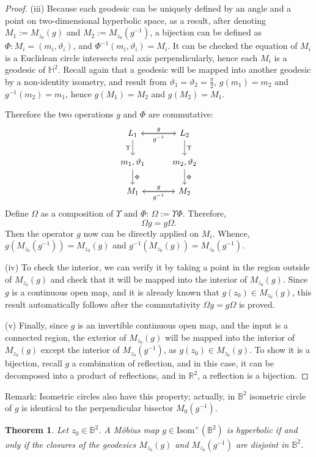 \documentclass[12pt,oneside]{sfsuthesis}
\theoremstyle{plain} %
\newtheorem{theorem}{Theorem}[chapter]
\theoremstyle{definition}  %
\theoremstyle{remark}  %
\theoremstyle{plain}
\begin{document}
{\begin{proof}
(iii) Because each geodesic can be uniquely defined by an angle and a point on two-dimensional hyperbolic space, as a result, after denoting $M_1:=M_{z_0}(g)$ and $M_2:=M_{z_0}(g^{-1})$, a bijection can be defined as $\Phi:M_i=(m_i,\vartheta_i)$, and $\Phi^{-1}(m_i,\vartheta_i)=M_i$. It can be checked the equation of $M_i$ is a Euclidean circle intersects real axis perpendicularly, hence each $M_i$ is a geodesic of $\mathbb{H}^2$. Recall again that a geodesic will be mapped into another geodesic by a non-identity isometry, and result from $\vartheta_1=\vartheta_2=\frac{\pi}{2}$, $g(m_1)=m_2$ and $g^{-1}(m_2)=m_1$, hence $g(M_1)=M_2$ and $g(M_2)=M_1$.

Therefore the two operations $g$ and $\Phi$ are commutative:
\[ \begin{tikzcd}
L_1 \arrow{r}{g} \arrow[swap]{d}{\Upsilon} &\arrow{l}{g^{-1}} L_2 \arrow{d}{\Upsilon} \\%
m_1,\vartheta_1\arrow{d}{\Phi} & m_2,\vartheta_2\arrow{d}{\Phi}
\\%
M_1 \arrow{r}{g}& \arrow{l}{g^{-1}} M_2
\end{tikzcd}
\]
Define $\Omega$ as a composition of $\Upsilon$ and $\Phi$: $\Omega:=\Upsilon\Phi$. Therefore, $$ \Omega g = g \Omega.$$ Then the operator $g$ now can be directly applied on $M_i$. Whence, $g(M_{z_0}(g^{-1}))=M_{z_0}(g)$ and $g^{-1}(M_{z_0}(g))=M_{z_0}(g^{-1}).$

(iv) To check the interior, we can verify it by taking a point in the region outside of $M_{z_0}(g)$ and check that it will be mapped into the interior of $M_{z_0}(g)$. Since $g$ is a continuous open map, and it is already known that $g(z_0)\in M_{z_0}(g)$, this result automatically follows after the commutativity $\Omega g = g \Omega$ is proved.

(v) Finally, since $g$ is an invertible continuous open map, and the input is a connected region, the exterior of $M_{z_0}(g)$ will be mapped into the interior of $M_{z_0}(g)$ except the interior of $M_{z_0}(g^{-1})$, as $g(z_0)\in M_{z_0}(g)$. To show it is a bijection, recall $g$ a combination of reflection, and in this case, it can be decomposed into a product of reflections, and in $\mathbb{R}^2$, a reflection is a bijection.   
\end{proof}

Remark: Isometric circles also have this property; actually, in $\mathbb{B}^2$ isometric circle of $g$ is identical to the perpendicular bisector $M_{0}(g^{-1})$.

\begin{theorem}\label{hyperbolic lines}
Let $z_0\in\mathbb{B}^2$. A M\"{o}bius map $g\in\text{Isom}^+(\mathbb{B}^2)$ is hyperbolic if and only if the closures of the geodesics $M_{z_0}(g)$ and $M_{z_0}(g^{-1})$ are disjoint in $\overline{\mathbb{B}^2}$.
\end{theorem}



}
\end{document}
